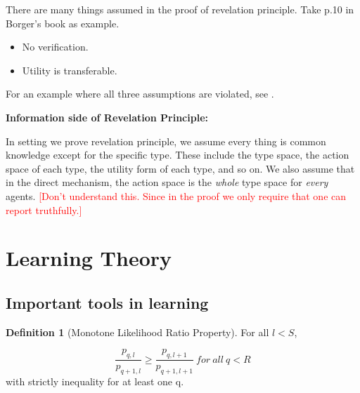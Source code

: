 \documentclass{book}
\theoremstyle{plain}
\theoremstyle{definition}
\newtheorem{defn}{Definition}[section] %
\begin{document}
There are many things assumed in the proof of revelation principle. Take p.10 in Borger's book as example.

\begin{itemize}
	\item No verification.
	\item Utility is transferable.
\end{itemize}

For an example where all three assumptions are violated, see \cite*{BenPorath:2014bc}.


\begin{mdframed}[style=comment]
\noindent
\textbf{Information side of Revelation Principle:}

In setting we prove revelation principle, we assume every thing is common knowledge except for the specific type.
These include the type space, the action space of each type, the utility form of each type, and so on. 
We also assume that in the direct mechanism, the action space is the \textit{whole} type space for \textit{every} agents.
\textcolor{red}{[Don't understand this. Since in the proof we only require that one can report truthfully.]}

\end{mdframed}








\section{Learning Theory} %
\label{sec:learning_theory}

\subsection{Important tools in learning} %
\label{sub:important_tools_in_learning}

\begin{defn}[Monotone Likelihood Ratio Property]
For all $l<S$,

\[\frac{p_{q,l}}{p_{q+1,l}} \geq \frac{p_{q,l+1}}{p_{q+1,l+1}} \ for \ all \ q<R\]
with strictly inequality for at least one q.

\end{defn}
\end{document}

